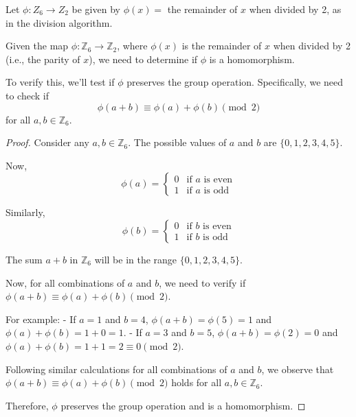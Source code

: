 \documentclass[12pt]{amsart}
\theoremstyle{definition}
\numberwithin{equation}{section}
\theoremstyle{plain}
\begin{document}
\begin{exercise}{4} Let $\phi : Z_6 \rightarrow Z_2$ be given by $\phi(x) =$ the remainder of $x$ when divided by 2, as in the division algorithm.

    Given the map \( \phi : \mathbb{Z}_6 \rightarrow \mathbb{Z}_2 \), where \( \phi(x) \) is the remainder of \( x \) when divided by 2 (i.e., the parity of \( x \)), we need to determine if \( \phi \) is a homomorphism.
    
    To verify this, we'll test if \( \phi \) preserves the group operation. Specifically, we need to check if 
    \[
        \phi(a + b) \equiv \phi(a) + \phi(b) \pmod{2}
        \]
        for all \( a, b \in \mathbb{Z}_6 \).
        
    \begin{proof}
Consider any \( a, b \in \mathbb{Z}_6 \). The possible values of \( a \) and \( b \) are \( \{0, 1, 2, 3, 4, 5\} \).

Now, 
\[
\phi(a) = 
\begin{cases} 
0 & \text{if } a \text{ is even} \\
1 & \text{if } a \text{ is odd}
\end{cases}
\]

Similarly, 
\[
\phi(b) = 
\begin{cases} 
0 & \text{if } b \text{ is even} \\
1 & \text{if } b \text{ is odd}
\end{cases}
\]

The sum \( a+b \) in \( \mathbb{Z}_6 \) will be in the range \( \{0, 1, 2, 3, 4, 5\} \). 

Now, for all combinations of \( a \) and \( b \), we need to verify if \( \phi(a+b) \equiv \phi(a) + \phi(b) \pmod{2} \).

For example:
- If \( a = 1 \) and \( b = 4 \), \( \phi(a+b) = \phi(5) = 1 \) and \( \phi(a) + \phi(b) = 1 + 0 = 1 \).
- If \( a = 3 \) and \( b = 5 \), \( \phi(a+b) = \phi(2) = 0 \) and \( \phi(a) + \phi(b) = 1 + 1 = 2 \equiv 0 \pmod{2} \).

Following similar calculations for all combinations of \( a \) and \( b \), we observe that \( \phi(a+b) \equiv \phi(a) + \phi(b) \pmod{2} \) holds for all \( a, b \in \mathbb{Z}_6 \).

Therefore, \( \phi \) preserves the group operation and is a homomorphism.
    \end{proof}
\end{exercise}
\vspace*{20pt}
\end{document}
